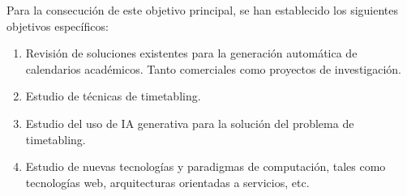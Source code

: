 Para la consecución de este objetivo principal, se han establecido los siguientes objetivos específicos:
\begin{enumerate}
    \item Revisión de soluciones existentes para la generación automática de calendarios académicos. Tanto comerciales como proyectos de investigación.
    \item Estudio de técnicas de timetabling.
    \item Estudio del uso de IA generativa para la solución del problema de timetabling.
    \item Estudio de nuevas tecnologías y paradigmas de computación, tales como tecnologías web, arquitecturas orientadas a servicios, etc.
\end{enumerate}